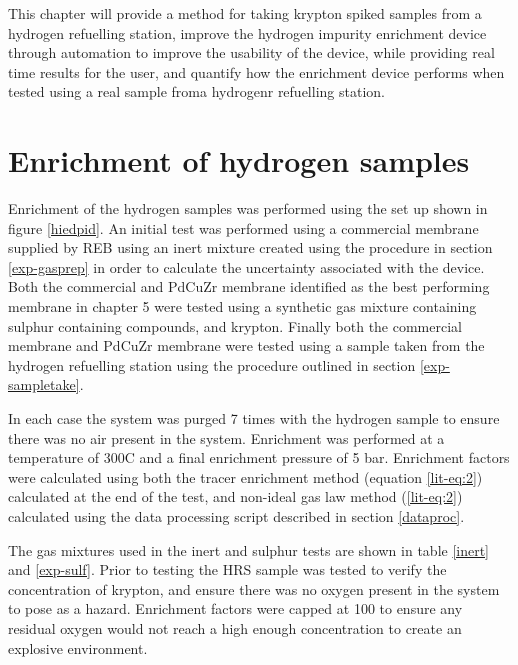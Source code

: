 This chapter will provide a method for taking krypton spiked samples from a hydrogen refuelling station, improve the hydrogen impurity enrichment device through automation to improve the usability of the device, while providing real time results for the user, and quantify how the enrichment device performs when tested using a real sample froma  hydrogenr refuelling station. 

\section{Enrichment of hydrogen samples}
Enrichment of the hydrogen samples was performed using the set up shown in figure \ref{hiedpid}. An initial test was performed using a commercial membrane supplied by REB using an inert mixture created using the procedure in section \ref{exp-gasprep} in order to calculate the uncertainty associated with the device. Both the commercial and PdCuZr membrane identified as the best performing membrane in chapter 5 were tested using a synthetic gas mixture containing sulphur containing compounds, and krypton. Finally both the commercial membrane and PdCuZr membrane were tested using a sample taken from the hydrogen refuelling station using the procedure outlined in section \ref{exp-sampletake}.

In each case the system was purged 7 times with the hydrogen sample to ensure there was no air present in the system. Enrichment was performed at a temperature of 300\textdegree C and a final enrichment pressure of 5 bar. Enrichment factors were calculated using both the tracer enrichment method (equation \ref{lit-eq:2}) calculated at the end of the test, and non-ideal gas law method (\ref{lit-eq:2}) calculated using the data processing script described in section \ref{dataproc}.

The gas mixtures used in the inert and sulphur tests are shown in table \ref{inert} and \ref{exp-sulf}. Prior to testing the HRS sample was tested to verify the concentration of krypton, and ensure there was no oxygen present in the system to pose as a hazard. Enrichment factors were capped at 100 to ensure any residual oxygen would not reach a high enough concentration to create an explosive environment.

